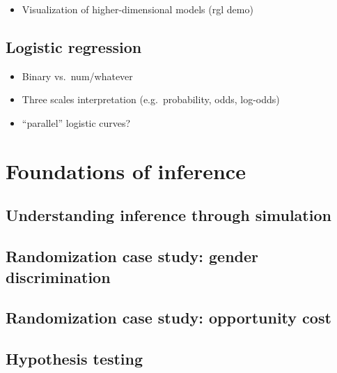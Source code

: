 \documentclass[]{book}
\providecommand{\tightlist}{%
  \setlength{\itemsep}{0pt}\setlength{\parskip}{0pt}}
\begin{document}
\begin{itemize}
\tightlist
\item
  Visualization of higher-dimensional models (rgl demo)
\end{itemize}

\hypertarget{logistic-regression}{%
\section{Logistic regression}\label{logistic-regression}}

\begin{itemize}
\tightlist
\item
  Binary vs.~num/whatever
\item
  Three scales interpretation (e.g.~probability, odds, log-odds)
\item
  ``parallel'' logistic curves?
\end{itemize}

\hypertarget{inference-foundations}{%
\chapter{Foundations of inference}\label{inference-foundations}}

\hypertarget{understanding-inference-through-simulation}{%
\section{Understanding inference through simulation}\label{understanding-inference-through-simulation}}

\hypertarget{randomization-case-study-gender-discrimination}{%
\section{Randomization case study: gender discrimination}\label{randomization-case-study-gender-discrimination}}

\hypertarget{randomization-case-study-opportunity-cost}{%
\section{Randomization case study: opportunity cost}\label{randomization-case-study-opportunity-cost}}

\hypertarget{hypothesis-testing}{%
\section{Hypothesis testing}\label{hypothesis-testing}}
\end{document}
